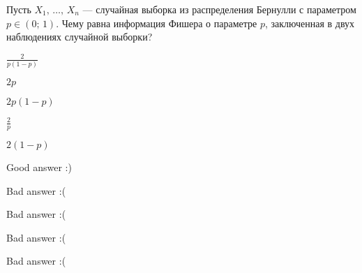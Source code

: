 
\begin{question}
Пусть \(X_1, \, \ldots, \, X_n\) --- случайная выборка из распределения
Бернулли с параметром \(p \in (0;\,1)\). Чему равна информация Фишера о
параметре \(p\), заключенная в двух наблюдениях случайной выборки?
\begin{answerlist}
  \item \(\tfrac{2}{p(1-p)}\)
  \item \(2p\)
  \item \(2p(1-p)\)
  \item \(\tfrac{2}{p}\)
  \item \(2(1 - p)\)
\end{answerlist}
\end{question}

\begin{solution}
\begin{answerlist}
  \item Good answer :)
  \item Bad answer :(
  \item Bad answer :(
  \item Bad answer :(
  \item Bad answer :(
\end{answerlist}
\end{solution}


